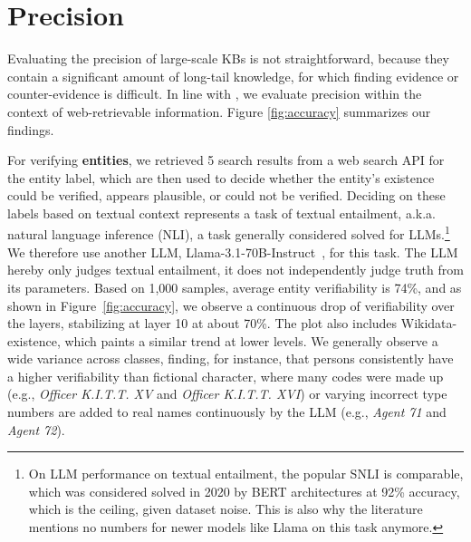 \section{Precision}
\label{sec:precision}

Evaluating the precision of large-scale KBs is not straightforward, because they contain a significant amount of long-tail knowledge, for which finding evidence or counter-evidence is difficult. In line with
\cite{yago}, we evaluate precision within the context of web-retrievable information. Figure \ref{fig:accuracy} summarizes our findings.

For verifying \textbf{entities}, we retrieved 5 search results from a web search API for the entity label, which are then used to decide whether the entity's existence could be verified, appears plausible, or could not be verified. Deciding on these labels based on textual context represents a task of textual entailment, a.k.a. natural language inference (NLI), a task generally considered solved for LLMs.\footnote{On LLM performance on textual entailment, the popular SNLI \cite{bowman-etal-2015-large} is comparable, which was considered solved in 2020 by BERT architectures \cite{bert-snli} at 92\% accuracy, which is the ceiling, given dataset noise. This is also why the literature mentions no numbers for newer models like Llama on this task anymore.} We therefore use another LLM, Llama-3.1-70B-Instruct~\cite{llama31}, for this task. The LLM hereby only judges textual entailment, it does not independently judge truth from its parameters.
Based on 1,000 samples, average entity verifiability is 74\%, and as shown in Figure~\ref{fig:accuracy}, we observe a continuous drop of verifiability over the layers, stabilizing at layer 10 at about 70\%. The plot also includes Wikidata-existence, which paints a similar trend at lower levels. We generally observe a wide variance across classes, finding, for instance, that persons consistently have a higher verifiability than fictional character, where many codes were made up (e.g., \textit{Officer K.I.T.T. XV} and \textit{Officer K.I.T.T. XVI}) or varying incorrect type numbers are added to real names  continuously by the LLM (e.g., \textit{Agent 71} and \textit{Agent 72}). 

